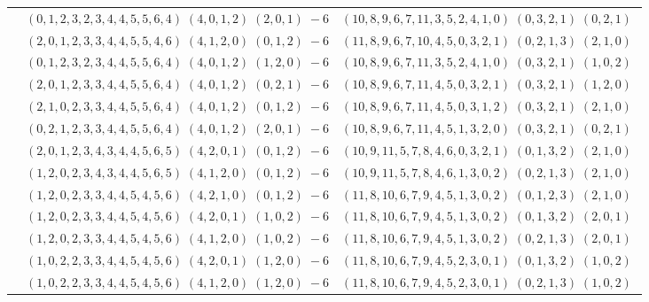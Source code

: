 \documentclass[11pt]{article}
\begin{document}
\begin{longtable}[l]{|c|c|c|}
 \cline{2-3} 
 & $(0 ,1 ,2 ,3 ,2 ,3 ,4 ,4 ,5 ,5 ,6 ,4) \;(4 ,0 ,1 ,2) \;(2 ,0 ,1) \;-6$ & $(10 ,8 ,9 ,6 ,7 ,11 ,3 ,5 ,2 ,4 ,1 ,0) \;(0 ,3 ,2 ,1) \;(0 ,2 ,1) \;$\\ 
 \cline{2-3} 
 & $(2 ,0 ,1 ,2 ,3 ,3 ,4 ,4 ,5 ,5 ,4 ,6) \;(4 ,1 ,2 ,0) \;(0 ,1 ,2) \;-6$ & $(11 ,8 ,9 ,6 ,7 ,10 ,4 ,5 ,0 ,3 ,2 ,1) \;(0 ,2 ,1 ,3) \;(2 ,1 ,0) \;$\\ 
 \cline{2-3} 
 & $(0 ,1 ,2 ,3 ,2 ,3 ,4 ,4 ,5 ,5 ,6 ,4) \;(4 ,0 ,1 ,2) \;(1 ,2 ,0) \;-6$ & $(10 ,8 ,9 ,6 ,7 ,11 ,3 ,5 ,2 ,4 ,1 ,0) \;(0 ,3 ,2 ,1) \;(1 ,0 ,2) \;$\\ 
 \cline{2-3} 
 & $(2 ,0 ,1 ,2 ,3 ,3 ,4 ,4 ,5 ,5 ,6 ,4) \;(4 ,0 ,1 ,2) \;(0 ,2 ,1) \;-6$ & $(10 ,8 ,9 ,6 ,7 ,11 ,4 ,5 ,0 ,3 ,2 ,1) \;(0 ,3 ,2 ,1) \;(1 ,2 ,0) \;$\\ 
 \cline{2-3} 
 & $(2 ,1 ,0 ,2 ,3 ,3 ,4 ,4 ,5 ,5 ,6 ,4) \;(4 ,0 ,1 ,2) \;(0 ,1 ,2) \;-6$ & $(10 ,8 ,9 ,6 ,7 ,11 ,4 ,5 ,0 ,3 ,1 ,2) \;(0 ,3 ,2 ,1) \;(2 ,1 ,0) \;$\\ 
 \cline{2-3} 
 & $(0 ,2 ,1 ,2 ,3 ,3 ,4 ,4 ,5 ,5 ,6 ,4) \;(4 ,0 ,1 ,2) \;(2 ,0 ,1) \;-6$ & $(10 ,8 ,9 ,6 ,7 ,11 ,4 ,5 ,1 ,3 ,2 ,0) \;(0 ,3 ,2 ,1) \;(0 ,2 ,1) \;$\\ 
 \cline{2-3} 
 & $(2 ,0 ,1 ,2 ,3 ,4 ,3 ,4 ,4 ,5 ,6 ,5) \;(4 ,2 ,0 ,1) \;(0 ,1 ,2) \;-6$ & $(10 ,9 ,11 ,5 ,7 ,8 ,4 ,6 ,0 ,3 ,2 ,1) \;(0 ,1 ,3 ,2) \;(2 ,1 ,0) \;$\\ 
 \cline{2-3} 
 & $(1 ,2 ,0 ,2 ,3 ,4 ,3 ,4 ,4 ,5 ,6 ,5) \;(4 ,1 ,2 ,0) \;(0 ,1 ,2) \;-6$ & $(10 ,9 ,11 ,5 ,7 ,8 ,4 ,6 ,1 ,3 ,0 ,2) \;(0 ,2 ,1 ,3) \;(2 ,1 ,0) \;$\\ 
 \cline{2-3} 
 & $(1 ,2 ,0 ,2 ,3 ,3 ,4 ,4 ,5 ,4 ,5 ,6) \;(4 ,2 ,1 ,0) \;(0 ,1 ,2) \;-6$ & $(11 ,8 ,10 ,6 ,7 ,9 ,4 ,5 ,1 ,3 ,0 ,2) \;(0 ,1 ,2 ,3) \;(2 ,1 ,0) \;$\\ 
 \cline{2-3} 
 & $(1 ,2 ,0 ,2 ,3 ,3 ,4 ,4 ,5 ,4 ,5 ,6) \;(4 ,2 ,0 ,1) \;(1 ,0 ,2) \;-6$ & $(11 ,8 ,10 ,6 ,7 ,9 ,4 ,5 ,1 ,3 ,0 ,2) \;(0 ,1 ,3 ,2) \;(2 ,0 ,1) \;$\\ 
 \cline{2-3} 
 & $(1 ,2 ,0 ,2 ,3 ,3 ,4 ,4 ,5 ,4 ,5 ,6) \;(4 ,1 ,2 ,0) \;(1 ,0 ,2) \;-6$ & $(11 ,8 ,10 ,6 ,7 ,9 ,4 ,5 ,1 ,3 ,0 ,2) \;(0 ,2 ,1 ,3) \;(2 ,0 ,1) \;$\\ 
 \cline{2-3} 
 & $(1 ,0 ,2 ,2 ,3 ,3 ,4 ,4 ,5 ,4 ,5 ,6) \;(4 ,2 ,0 ,1) \;(1 ,2 ,0) \;-6$ & $(11 ,8 ,10 ,6 ,7 ,9 ,4 ,5 ,2 ,3 ,0 ,1) \;(0 ,1 ,3 ,2) \;(1 ,0 ,2) \;$\\ 
 \cline{2-3} 
 & $(1 ,0 ,2 ,2 ,3 ,3 ,4 ,4 ,5 ,4 ,5 ,6) \;(4 ,1 ,2 ,0) \;(1 ,2 ,0) \;-6$ & $(11 ,8 ,10 ,6 ,7 ,9 ,4 ,5 ,2 ,3 ,0 ,1) \;(0 ,2 ,1 ,3) \;(1 ,0 ,2) \;$\\ 

\end{longtable}
\end{document}
